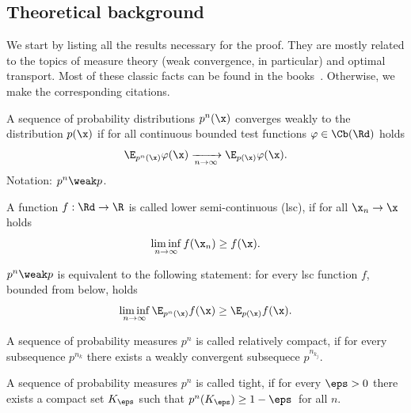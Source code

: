\subsection{Theoretical background}
\label{subsec:weak_conv}
We start by listing all the results necessary for the proof. They are mostly related to the topics of measure theory (weak convergence, in particular) and optimal transport. Most of these classic facts can be found in the books~\cite{bogachev2007measure, dudley2018real}. Otherwise, we make the corresponding citations.
\begin{definition}
    A sequence of probability distributions $p^n(\x)$ converges weakly to the distribution $p(\x)$ if for all continuous bounded test functions $\varphi \in \Cb(\Rd)$ holds
    \begin{equation}
        \E_{p^n(\x)} \varphi(\x) \xrightarrow[n \rightarrow \infty]{} \E_{p(\x)}\varphi(\x).
    \end{equation}
    Notation: $p^n \weak p$.
\end{definition}

\begin{definition}
    A function $f : \Rd \rightarrow \R$ is called lower semi-continuous (lsc), if for all $\x_n \rightarrow \x$ holds
    \begin{equation}
        \liminf\limits_{n \rightarrow \infty} f(\x_n) \geq f(\x).
    \end{equation}
\end{definition}

\begin{theorem}
\label{thm:alexandrov}
    $p^n \weak p$ is equivalent to the following statement: for every lsc function $f$, bounded from below, holds
    \begin{equation}
        \liminf\limits_{n \rightarrow \infty}\E_{p^n(\x)}f(\x) \geq \E_{p(\x)}f(\x).
    \end{equation}
\end{theorem}

\begin{definition}
    A sequence of probability measures $p^n$ is called relatively compact, if for every subsequence $p^{n_k}$ there exists a weakly convergent subsequece $p^{n_{k_j}}$.
\end{definition}

\begin{definition}
    A sequence of probability measures $p^n$ is called tight, if for every $\eps > 0$ there exists a compact set $K_\eps$ such that $p^n(K_\eps) \geq 1 - \eps\,$ for all $n$.
\end{definition}

